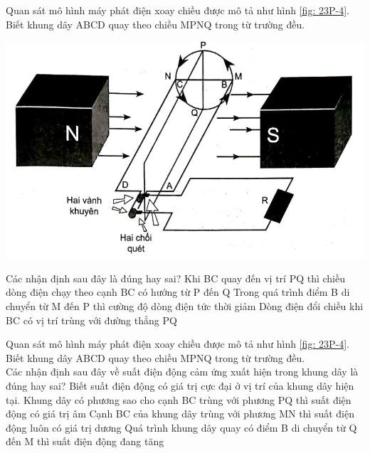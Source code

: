 \begin{ex}
	Quan sát mô hình máy phát điện xoay chiều được mô tả như hình \ref{fig: 23P-4}. Biết khung dây ABCD quay theo chiều MPNQ trong từ trường đều.
	\begin{center}
		\includegraphics[width=0.5\linewidth]{figs/VN12-Y24-PH-SYL-023P-4}
		\label{fig: 23P-4}
	\end{center}
	Các nhận định sau đây là đúng hay sai?
	{\True Khi BC quay đến vị trí PQ thì chiều dòng điện chạy theo cạnh BC có hướng từ P đến Q}
	{\True Trong quá trình điểm B di chuyển từ M đến P thì cường độ dòng điện tức thời giảm}
	{\True Dòng điện đổi chiều khi BC có vị trí trùng với đường thẳng PQ}
	\loigiai{}
\end{ex}
\begin{ex}
	Quan sát mô hình máy phát điện xoay chiều được mô tả như hình \ref{fig: 23P-4}. Biết khung dây ABCD quay theo chiều MPNQ trong từ trường đều.\\
	Các nhận định sau đây về suất điện động cảm ứng xuất hiện trong khung dây là đúng hay sai? Biết suất điện động có giá trị cực đại ở vị trí của khung dây hiện tại.
	{Khung dây có phương sao cho cạnh BC trùng với phương PQ thì suất điện động có giá trị âm}
	{Cạnh BC của khung dây trùng với phương MN thì suất điện động luôn có giá trị dương}
	{\True Quá trình khung dây quay có điểm B di chuyển từ Q đến M thì suất điện động đang tăng}
	\loigiai{}
\end{ex}

